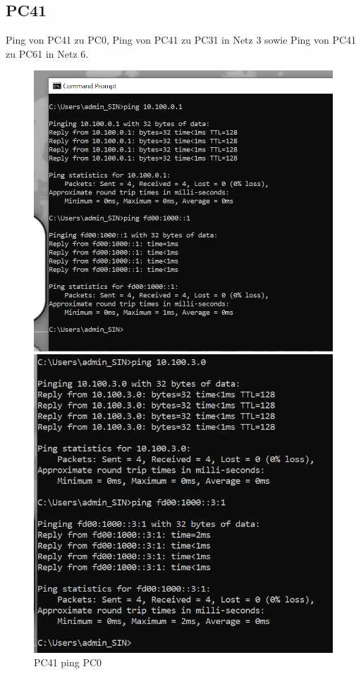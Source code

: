 \documentclass{article}
\begin{document}
\pagebreak
\subsection{PC41}
Ping von PC41 zu PC0, Ping von PC41 zu PC31 in Netz 3 sowie Ping von PC41 zu PC61 in Netz 6.\\
\begin{figure}[!htp]
  \centering
  \begin{minipage}[b]{0.25\textwidth}
    \includegraphics[width=\textwidth]{Arbeitsergebnisse/PC41/pc41_ping_pc0.png}
    \caption{PC41 ping PC0}
  \end{minipage}
  \hspace{0.8cm}
  \begin{minipage}[b]{0.25\textwidth}
    \includegraphics[width=\textwidth]{Arbeitsergebnisse/PC41/pc41_ping_net3.png}

\end{minipage}
\end{figure}
\end{document}
